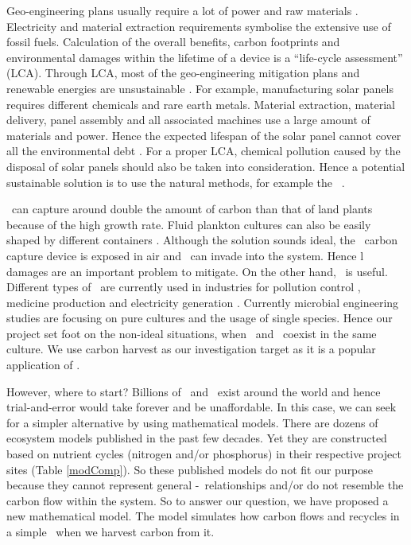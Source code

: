 \documentclass[../thesis.tex]{subfiles} %
\begin{document}
Geo-engineering plans usually require a lot of power and raw materials \autocite{boyd2008ranking,boyd2008implications,mcclellan2012cost}.  Electricity and material extraction requirements symbolise the extensive use of fossil fuels.  Calculation of the overall benefits, carbon footprints and environmental damages within the lifetime of a device is a ``life-cycle assessment” (LCA).  Through LCA, most of the geo-engineering mitigation plans and renewable energies are unsustainable \autocite{abdussalam2020green}.  For example, manufacturing solar panels requires different chemicals and rare earth metals.  Material extraction, material delivery, panel assembly and all associated machines use a large amount of materials and power.  Hence the expected lifespan of the solar panel cannot cover all the environmental debt \autocite{martinopoulos2020rooftop}.  For a proper LCA, chemical pollution caused by the disposal of solar panels should also be taken into consideration.  Hence a potential sustainable solution is to use the natural methods, for example the \phy\ \autocite{farrelly2013carbon}.

\Phy\ can capture around double the amount of carbon than that of land plants \autocite{SCHLESINGER2013341} because of the high growth rate.  Fluid plankton cultures can also be easily shaped by different containers \autocite{evanson_2019}.  Although the solution sounds ideal, the \phy\ carbon capture device is exposed in air and \bac\ can invade into the system.  Hence \bac l damages are an important problem to mitigate.  On the other hand, \bac\ is useful.  Different types of \bac\ are currently used in industries for pollution control \autocite{dash2013marine,naik2013lead}, medicine production \autocite{huang2012industrial} and electricity generation \autocite{songera2012electricity}.  Currently microbial engineering studies are focusing on pure cultures and the usage of single species.  Hence our project set foot on the non-ideal situations, when \bac\ and \phy\ coexist in the same culture.  We use carbon harvest as our investigation target as it is a popular application of \phy.

However, where to start?  Billions of \phy\ and \bac\ exist around the world and hence trial-and-error would take forever and be unaffordable.  In this case, we can seek for a simpler alternative by using mathematical models.  There are dozens of ecosystem models published in the past few decades.  Yet they are constructed based on nutrient cycles (nitrogen and/or phosphorus) in their respective project sites (Table \ref{modComp}).  So these published models do not fit our purpose because they cannot represent general \phy-\bac\ relationships and/or do not resemble the carbon flow within the system.  So to answer our question, we have proposed a new mathematical model.  The model simulates how carbon flows and recycles in a simple \pbs\ when we harvest carbon from it.
\end{document}
